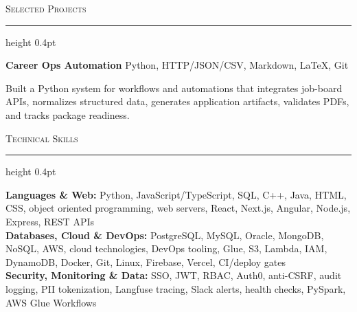 \documentclass[letterpaper,11pt]{article}
\newcommand{\resumesection}[1]{%
  \par\vspace{2pt}%
  {\large\scshape #1}\par\vspace{2pt}%
  \hrule height 0.4pt\vspace{2pt}%
}
\newcommand{\projectHeading}[2]{
  \textbf{#1} \hfill #2
}
\begin{document}
\resumesection{Selected Projects}
\projectHeading{Career Ops Automation}{Python, HTTP/JSON/CSV, Markdown, LaTeX, Git}
\begin{tightitemize}
  \item Built a Python system for workflows and automations that integrates job-board APIs, normalizes structured data, generates application artifacts, validates PDFs, and tracks package readiness.
\end{tightitemize}

\resumesection{Technical Skills}
\textbf{Languages \& Web:} Python, JavaScript/TypeScript, SQL, C++, Java, HTML, CSS, object oriented programming, web servers, React, Next.js, Angular, Node.js, Express, REST APIs\\
\textbf{Databases, Cloud \& DevOps:} PostgreSQL, MySQL, Oracle, MongoDB, NoSQL, AWS, cloud technologies, DevOps tooling, Glue, S3, Lambda, IAM, DynamoDB, Docker, Git, Linux, Firebase, Vercel, CI/deploy gates\\
\textbf{Security, Monitoring \& Data:} SSO, JWT, RBAC, Auth0, anti-CSRF, audit logging, PII tokenization, Langfuse tracing, Slack alerts, health checks, PySpark, AWS Glue Workflows
\end{document}

